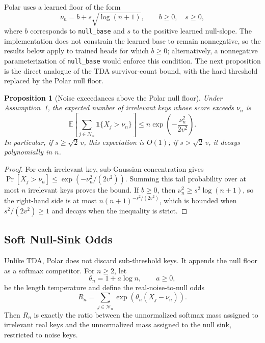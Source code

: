 \documentclass{article} %
\newtheorem{proposition}{Proposition}
\begin{document}
Polar uses a learned floor of the form
\begin{equation}
    \nu_n = b + s\sqrt{\log(n+1)}, \qquad b \ge 0,\quad s \ge 0,
\end{equation}
where $b$ corresponds to \texttt{null\_base} and $s$ to the positive learned null-slope.
The implementation does not constrain the learned base to remain nonnegative, so the results
below apply to trained heads for which $b\ge0$; alternatively, a nonnegative parameterization
of \texttt{null\_base} would enforce this condition.
The next proposition is the direct analogue of the TDA survivor-count bound, with the
hard threshold replaced by the Polar null floor.

\begin{proposition}[Noise exceedances above the Polar null floor]
Under Assumption~1, the expected number of irrelevant keys whose score exceeds $\nu_n$ is
\begin{equation}
    \mathbb{E}\left[\sum_{j \in \mathcal{N}_n} \mathbf{1}\{X_j > \nu_n\}\right]
    \le
    n \exp\left(-\frac{\nu_n^2}{2v^2}\right).
\end{equation}
In particular, if $s \ge \sqrt{2}\,v$, this expectation is $O(1)$; if
$s > \sqrt{2}\,v$, it decays polynomially in $n$.
\end{proposition}

\begin{proof}
For each irrelevant key, sub-Gaussian concentration gives
$\Pr[X_j > \nu_n] \le \exp(-\nu_n^2/(2v^2))$. Summing this tail probability over at most
$n$ irrelevant keys proves the bound. If $b \ge 0$, then
$\nu_n^2 \ge s^2\log(n+1)$, so the right-hand side is at most
$n(n+1)^{-s^2/(2v^2)}$, which is bounded when $s^2/(2v^2)\ge 1$ and decays when the
inequality is strict.
\end{proof}

\subsection{Soft Null-Sink Odds}

Unlike TDA, Polar does not discard sub-threshold keys. It appends the null floor as a softmax
competitor. For $n\ge2$, let
\begin{equation}
    \theta_n = 1 + a\log n, \qquad a \ge 0,
\end{equation}
be the length temperature and define the real-noise-to-null odds
\begin{equation}
    R_n = \sum_{j\in\mathcal{N}_n}\exp\left(\theta_n(X_j-\nu_n)\right).
\end{equation}
Then $R_n$ is exactly the ratio between the unnormalized softmax mass assigned to irrelevant
real keys and the unnormalized mass assigned to the null sink, restricted to noise keys.
\end{document}
